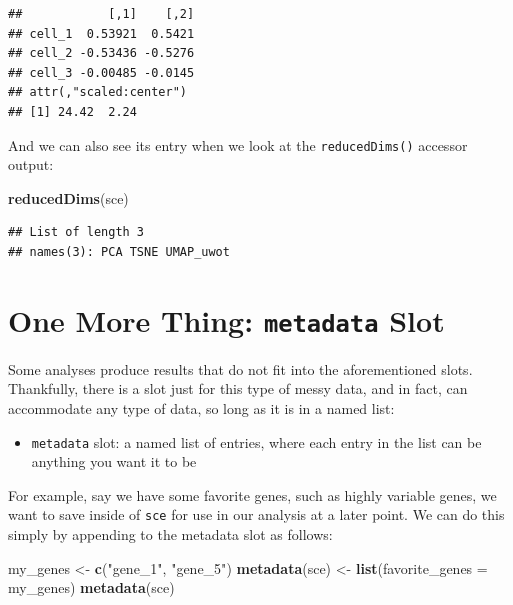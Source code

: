 \documentclass[]{book}
\newenvironment{Shaded}{\begin{snugshade}}{\end{snugshade}}
\newcommand{\DataTypeTok}[1]{\textcolor[rgb]{0.13,0.29,0.53}{#1}}
\newcommand{\KeywordTok}[1]{\textcolor[rgb]{0.13,0.29,0.53}{\textbf{#1}}}
\newcommand{\NormalTok}[1]{#1}
\newcommand{\StringTok}[1]{\textcolor[rgb]{0.31,0.60,0.02}{#1}}
\providecommand{\tightlist}{%
  \setlength{\itemsep}{0pt}\setlength{\parskip}{0pt}}
\begin{document}
\begin{verbatim}
##            [,1]    [,2]
## cell_1  0.53921  0.5421
## cell_2 -0.53436 -0.5276
## cell_3 -0.00485 -0.0145
## attr(,"scaled:center")
## [1] 24.42  2.24
\end{verbatim}

And we can also see its entry when we look at the \texttt{reducedDims()} accessor output:

\begin{Shaded}
\begin{Highlighting}[]
\KeywordTok{reducedDims}\NormalTok{(sce)}
\end{Highlighting}
\end{Shaded}

\begin{verbatim}
## List of length 3
## names(3): PCA TSNE UMAP_uwot
\end{verbatim}

\hypertarget{one-more-thing-metadata-slot}{%
\section{\texorpdfstring{One More Thing: \texttt{metadata} Slot}{One More Thing: metadata Slot}}\label{one-more-thing-metadata-slot}}

Some analyses produce results that do not fit into the aforementioned slots. Thankfully, there is a slot just for this type of messy data, and in fact, can accommodate any type of data, so long as it is in a named list:

\begin{itemize}
\tightlist
\item
  \texttt{metadata} slot: a named list of entries, where each entry in the list can be anything you want it to be
\end{itemize}

For example, say we have some favorite genes, such as highly variable genes, we want to save inside of \texttt{sce} for use in our analysis at a later point. We can do this simply by appending to the metadata slot as follows:

\begin{Shaded}
\begin{Highlighting}[]
\NormalTok{my_genes <-}\StringTok{ }\KeywordTok{c}\NormalTok{(}\StringTok{"gene_1"}\NormalTok{, }\StringTok{"gene_5"}\NormalTok{)}
\KeywordTok{metadata}\NormalTok{(sce) <-}\StringTok{ }\KeywordTok{list}\NormalTok{(}\DataTypeTok{favorite_genes =}\NormalTok{ my_genes)}
\KeywordTok{metadata}\NormalTok{(sce)}
\end{Highlighting}
\end{Shaded}
\end{document}
